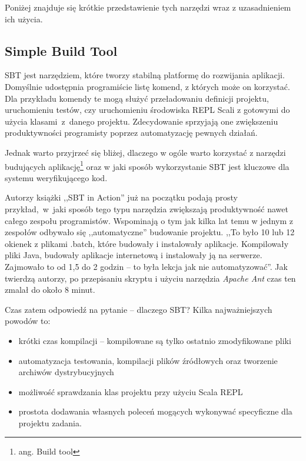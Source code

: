 \documentclass[wimgr]{xmgr}
\begin{document}
Poniżej znajduje się krótkie przedstawienie tych narzędzi wraz z uzasadnieniem ich użycia. 

\subsection{Simple Build Tool}

SBT jest narzędziem, które tworzy stabilną platformę do rozwijania aplikacji. Domyślnie udostępnia programiście listę komend, z których może on korzystać. Dla przykładu komendy te mogą służyć przeładowaniu definicji projektu, uruchomieniu testów, czy uruchomieniu środowiska REPL Scali z gotowymi do użycia klasami~z~danego projektu. Zdecydowanie sprzyjają one zwiększeniu produktywności programisty poprzez automatyzację pewnych działań.

Jednak warto przyjrzeć się bliżej, dlaczego w ogóle warto korzystać z narzędzi budujących aplikację\footnote{ang. Build tool} oraz w jaki sposób wykorzystanie SBT jest kluczowe dla systemu weryfikującego kod. 

Autorzy książki ,,SBT in Action'' już na początku podają prosty przykład,~w~jaki sposób tego typu narzędzia zwiększają produktywność nawet całego zespołu programistów. Wspominają o tym jak kilka lat temu w jednym z zespołów odbywało się ,,automatyczne'' budowanie projektu. ,,To było 10 lub 12 okienek z plikami .batch, które budowały i instalowały aplikacje. Kompilowały pliki Java, budowały aplikacje internetową i instalowały ją na serwerze. Zajmowało to od 1,5 do 2 godzin -- to była lekcja jak nie automatyzować''. \cite[s.1]{Suereth:2014:SIA} Jak twierdzą autorzy, po przepisaniu skryptu i użyciu narzędzia \emph{Apache Ant} czas ten zmalał do około 8 minut.

Czas zatem odpowiedź na pytanie -- dlaczego SBT? Kilka najważniejszych powodów to:
\begin{itemize}
\item krótki czas kompilacji -- kompilowane są tylko ostatnio zmodyfikowane pliki
\item automatyzacja testowania, kompilacji plików źródłowych oraz tworzenie archiwów dystrybucyjnych
\item możliwość sprawdzania klas projektu przy użyciu Scala REPL
\item prostota dodawania własnych poleceń mogących wykonywać specyficzne dla projektu zadania.   
\end{itemize}
\end{document}
